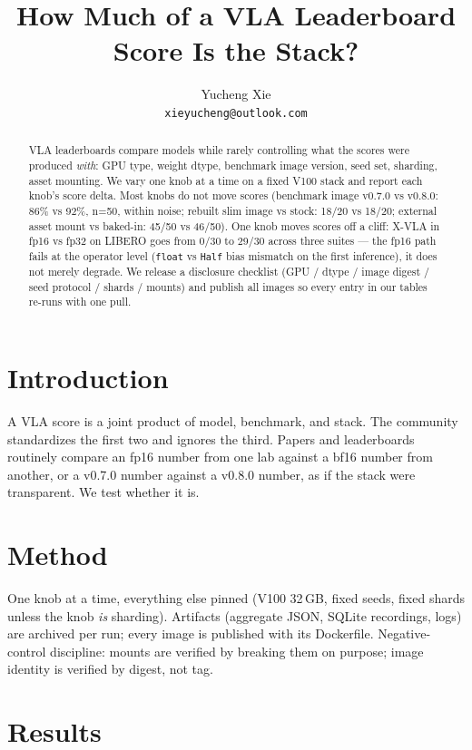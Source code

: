 \documentclass{article}
\title{How Much of a VLA Leaderboard Score Is the Stack?}
\author{
  Yucheng Xie \\
  \texttt{xieyucheng@outlook.com}
}
\begin{document}
\maketitle

\begin{abstract}
VLA leaderboards compare models while rarely controlling what the scores
were produced \emph{with}: GPU type, weight dtype, benchmark image version,
seed set, sharding, asset mounting. We vary one knob at a time on a fixed
V100 stack and report each knob's score delta. Most knobs do not move scores
(benchmark image v0.7.0 vs v0.8.0: 86\% vs 92\%, n=50, within noise; rebuilt
slim image vs stock: 18/20 vs 18/20; external asset mount vs baked-in: 45/50
vs 46/50). One knob moves scores off a cliff: X-VLA in fp16 vs fp32 on
LIBERO goes from 0/30 to 29/30 across three suites --- the fp16 path fails
at the operator level (\texttt{float} vs \texttt{Half} bias mismatch on the
first inference), it does not merely degrade. We release a disclosure
checklist (GPU / dtype / image digest / seed protocol / shards / mounts) and
publish all images so every entry in our tables re-runs with one pull.
\end{abstract}

\section{Introduction}
A VLA score is a joint product of model, benchmark, and stack. The community
standardizes the first two and ignores the third. Papers and leaderboards
routinely compare an fp16 number from one lab against a bf16 number from
another, or a v0.7.0 number against a v0.8.0 number, as if the stack were
transparent. We test whether it is.

\section{Method}
One knob at a time, everything else pinned (V100 32\,GB, fixed seeds, fixed
shards unless the knob \emph{is} sharding). Artifacts (aggregate JSON,
SQLite recordings, logs) are archived per run; every image is published with
its Dockerfile. Negative-control discipline: mounts are verified by breaking
them on purpose; image identity is verified by digest, not tag.

\section{Results}
\label{sec:results}
\end{document}

